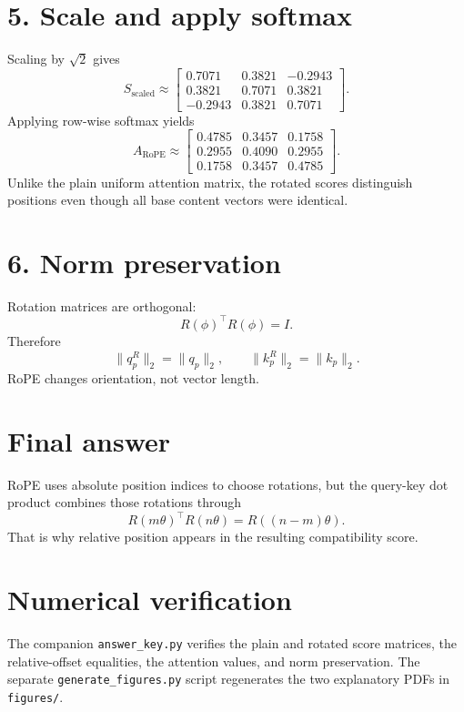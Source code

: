 \documentclass[11pt]{article}
\begin{document}
\section*{5. Scale and apply softmax}

Scaling by $\sqrt{2}$ gives
\[
S_{\mathrm{scaled}}
\approx
\begin{bmatrix}
0.7071&0.3821&-0.2943\\
0.3821&0.7071&0.3821\\
-0.2943&0.3821&0.7071
\end{bmatrix}.
\]
Applying row-wise softmax yields
\[
A_{\mathrm{RoPE}}
\approx
\begin{bmatrix}
0.4785&0.3457&0.1758\\
0.2955&0.4090&0.2955\\
0.1758&0.3457&0.4785
\end{bmatrix}.
\]
Unlike the plain uniform attention matrix, the rotated scores distinguish positions even though all base content vectors were identical.

\section*{6. Norm preservation}

Rotation matrices are orthogonal:
\[
R(\phi)^\top R(\phi)=I.
\]
Therefore
\[
\|q_p^R\|_2=\|q_p\|_2,
\qquad
\|k_p^R\|_2=\|k_p\|_2.
\]
RoPE changes orientation, not vector length.

\section*{Final answer}

RoPE uses absolute position indices to choose rotations, but the query-key dot product combines those rotations through
\[
R(m\theta)^\top R(n\theta)=R((n-m)\theta).
\]
That is why relative position appears in the resulting compatibility score.

\section*{Numerical verification}

The companion \texttt{answer\_key.py} verifies the plain and rotated score matrices, the relative-offset equalities, the attention values, and norm preservation. The separate \texttt{generate\_figures.py} script regenerates the two explanatory PDFs in \texttt{figures/}.
\end{document}
